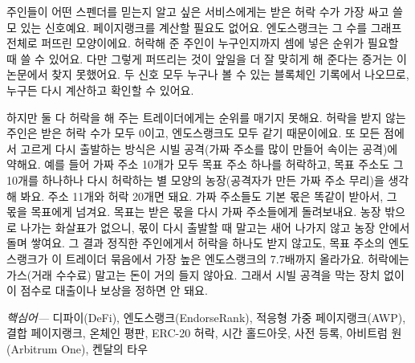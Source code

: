 주인들이 어떤 스펜더를 믿는지 알고 싶은 서비스에게는 받은 허락 수가 가장 싸고 쓸모 있는 신호예요. 페이지랭크를 계산할 필요도 없어요. 엔도스랭크는 그 수를 그래프 전체로 퍼뜨린 모양이에요. 허락해 준 주인이 누구인지까지 셈에 넣은 순위가 필요할 때 쓸 수 있어요. 다만 그렇게 퍼뜨리는 것이 앞일을 더 잘 맞히게 해 준다는 증거는 이 논문에서 찾지 못했어요. 두 신호 모두 누구나 볼 수 있는 블록체인 기록에서 나오므로, 누구든 다시 계산하고 확인할 수 있어요.

하지만 둘 다 허락을 해 주는 트레이더에게는 순위를 매기지 못해요. 허락을 받지 않는 주인은 받은 허락 수가 모두 0이고, 엔도스랭크도 모두 같기 때문이에요. 또 모든 점에서 고르게 다시 출발하는 방식은 시빌 공격(가짜 주소를 많이 만들어 속이는 공격)에 약해요. 예를 들어 가짜 주소 10개가 모두 목표 주소 하나를 허락하고, 목표 주소도 그 10개를 하나하나 다시 허락하는 별 모양의 농장(공격자가 만든 가짜 주소 무리)을 생각해 봐요. 주소 11개와 허락 20개면 돼요. 가짜 주소들도 기본 몫은 똑같이 받아서, 그 몫을 목표에게 넘겨요. 목표는 받은 몫을 다시 가짜 주소들에게 돌려보내요. 농장 밖으로 나가는 화살표가 없으니, 몫이 다시 출발할 때 말고는 새어 나가지 않고 농장 안에서 돌며 쌓여요. 그 결과 정직한 주인에게서 허락을 하나도 받지 않고도, 목표 주소의 엔도스랭크가 이 트레이더 묶음에서 가장 높은 엔도스랭크의 7.7배까지 올라가요. 허락에는 가스(거래 수수료) 말고는 돈이 거의 들지 않아요. 그래서 시빌 공격을 막는 장치 없이 이 점수로 대출이나 보상을 정하면 안 돼요.

\emph{핵심어---} 디파이(DeFi), 엔도스랭크(EndorseRank), 적응형 가중 페이지랭크(AWP), 결합 페이지랭크, 온체인 평판, ERC-20 허락, 시간 홀드아웃, 사전 등록, 아비트럼 원(Arbitrum One), 켄달의 타우
